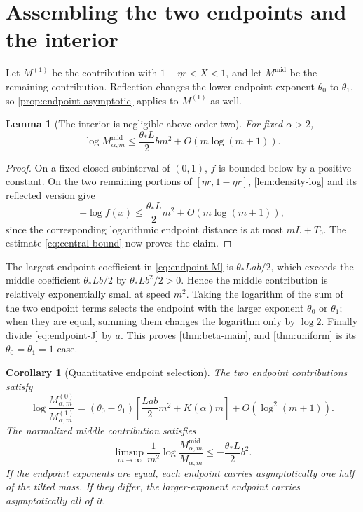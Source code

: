 \documentclass[11pt,a4paper]{article}
\numberwithin{equation}{section}
\newtheorem{lemma}[lemma]{Lemma}
\newtheorem{corollary}[corollary]{Corollary}
\theoremstyle{definition}\newaliascnt{definition}{theorem}
\theoremstyle{remark}\newaliascnt{remark}{theorem}
\begin{document}
\section{Assembling the two endpoints and the interior}
\label{sec:assembly}
Let $M^{(1)}$ be the contribution with $1-\eta r<X<1$, and let
$M^{\mathrm{mid}}$ be the remaining contribution. Reflection changes the
lower-endpoint exponent $\theta_0$ to $\theta_1$, so
\cref{prop:endpoint-asymptotic} applies to $M^{(1)}$ as well.

\begin{lemma}[The interior is negligible above order two]
\label{lem:middle}
For fixed $\alpha>2$,
\begin{equation}
 \log M_{\alpha,m}^{\mathrm{mid}}
 \le\frac{\theta_*L}{2}b m^2+O(m\log(m+1)).
 \label{eq:middle-bound}
\end{equation}
\end{lemma}
\begin{proof}
On a fixed closed subinterval of $(0,1)$, $f$ is bounded below by a positive
constant. On the two remaining portions of
$[\eta r,1-\eta r]$, \cref{lem:density-log} and its reflected version give
\[
 -\log f(x)\le\frac{\theta_*L}{2}m^2+O(m\log(m+1)),
\]
since the corresponding logarithmic endpoint distance is at most
$mL+T_0$. The estimate \eqref{eq:central-bound} now proves the claim.
\end{proof}
The largest endpoint coefficient in \eqref{eq:endpoint-M} is
$\theta_*Lab/2$, which exceeds the middle coefficient
$\theta_*Lb/2$ by $\theta_*Lb^2/2>0$.
Hence the middle contribution is relatively exponentially small at speed
$m^2$. Taking the logarithm of the sum of the two endpoint terms selects
the endpoint with the larger exponent $\theta_0$ or $\theta_1$; when they are equal, summing them changes the logarithm
only by $\log2$. Finally divide \eqref{eq:endpoint-J} by $a$.
This proves \cref{thm:beta-main}, and \cref{thm:uniform} is its
$\theta_0=\theta_1=1$ case.

\begin{corollary}[Quantitative endpoint selection]
\label{cor:selection}
The two endpoint contributions satisfy
\begin{equation}
 \log\frac{M_{\alpha,m}^{(0)}}{M_{\alpha,m}^{(1)}}
 = (\theta_0-\theta_1)
    \left[\frac{Lab}{2}m^2+K(\alpha)m\right]
       +O(\log^2(m+1)).
 \label{eq:endpoint-ratio}
\end{equation}
The normalized middle contribution satisfies
\begin{equation}
 \limsup_{m\to\infty}\frac1{m^2}
 \log\frac{M_{\alpha,m}^{\mathrm{mid}}}{M_{\alpha,m}}
 \le-\frac{\theta_*L}{2}b^2.
 \label{eq:middle-probability}
\end{equation}
If the endpoint exponents are equal, each endpoint carries asymptotically
one half of the tilted mass. If they differ, the larger-exponent endpoint
carries asymptotically all of it.
\end{corollary}
\end{document}
